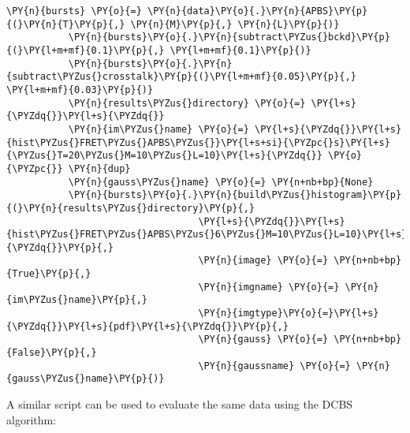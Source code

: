 \begin{Verbatim}[commandchars=\\\{\}, fontsize=\scriptsize]
           \PY{n}{bursts} \PY{o}{=} \PY{n}{data}\PY{o}{.}\PY{n}{APBS}\PY{p}{(}\PY{n}{T}\PY{p}{,} \PY{n}{M}\PY{p}{,} \PY{n}{L}\PY{p}{)}
           \PY{n}{bursts}\PY{o}{.}\PY{n}{subtract\PYZus{}bckd}\PY{p}{(}\PY{l+m+mf}{0.1}\PY{p}{,} \PY{l+m+mf}{0.1}\PY{p}{)}
           \PY{n}{bursts}\PY{o}{.}\PY{n}{subtract\PYZus{}crosstalk}\PY{p}{(}\PY{l+m+mf}{0.05}\PY{p}{,} \PY{l+m+mf}{0.03}\PY{p}{)}
           \PY{n}{results\PYZus{}directory} \PY{o}{=} \PY{l+s}{\PYZdq{}}\PY{l+s}{\PYZdq{}}
           \PY{n}{im\PYZus{}name} \PY{o}{=} \PY{l+s}{\PYZdq{}}\PY{l+s}{hist\PYZus{}FRET\PYZus{}APBS\PYZus{}}\PY{l+s+si}{\PYZpc{}s}\PY{l+s}{\PYZus{}T=20\PYZus{}M=10\PYZus{}L=10}\PY{l+s}{\PYZdq{}} \PY{o}{\PYZpc{}} \PY{n}{dup}
           \PY{n}{gauss\PYZus{}name} \PY{o}{=} \PY{n+nb+bp}{None}
           \PY{n}{bursts}\PY{o}{.}\PY{n}{build\PYZus{}histogram}\PY{p}{(}\PY{n}{results\PYZus{}directory}\PY{p}{,} 
                                  \PY{l+s}{\PYZdq{}}\PY{l+s}{hist\PYZus{}FRET\PYZus{}APBS\PYZus{}6\PYZus{}M=10\PYZus{}L=10}\PY{l+s}{\PYZdq{}}\PY{p}{,} 
                                  \PY{n}{image} \PY{o}{=} \PY{n+nb+bp}{True}\PY{p}{,} 
                                  \PY{n}{imgname} \PY{o}{=} \PY{n}{im\PYZus{}name}\PY{p}{,} 
                                  \PY{n}{imgtype}\PY{o}{=}\PY{l+s}{\PYZdq{}}\PY{l+s}{pdf}\PY{l+s}{\PYZdq{}}\PY{p}{,} 
                                  \PY{n}{gauss} \PY{o}{=} \PY{n+nb+bp}{False}\PY{p}{,} 
                                  \PY{n}{gaussname} \PY{o}{=} \PY{n}{gauss\PYZus{}name}\PY{p}{)}
\end{Verbatim}

A similar script can be used to evaluate the same data using the DCBS algorithm:

